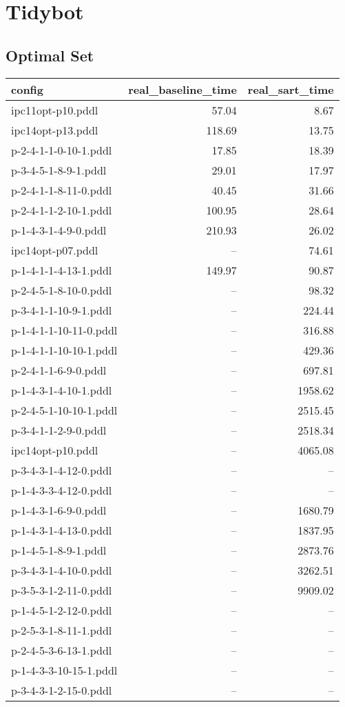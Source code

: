 \documentclass{article}
\begin{document}
                    
                \newpage \section{Tidybot}
                    \subsection*{Optimal Set}
                    
                            \begin{center}
                            \scriptsize
                            \begin{tabular}{@{}l|r|r@{}}
                            config & real\_baseline\_time & real\_sart\_time\\\midrule
                             ipc11opt-p10.pddl&57.04&8.67\\
 ipc14opt-p13.pddl&118.69&13.75\\
 p-2-4-1-1-0-10-1.pddl&17.85&18.39\\
 p-3-4-5-1-8-9-1.pddl&29.01&17.97\\
 p-2-4-1-1-8-11-0.pddl&40.45&31.66\\
 p-2-4-1-1-2-10-1.pddl&100.95&28.64\\
 p-1-4-3-1-4-9-0.pddl&210.93&26.02\\
 ipc14opt-p07.pddl&--&74.61\\
 p-1-4-1-1-4-13-1.pddl&149.97&90.87\\
 p-2-4-5-1-8-10-0.pddl&--&98.32\\
 p-3-4-1-1-10-9-1.pddl&--&224.44\\
 p-1-4-1-1-10-11-0.pddl&--&316.88\\
 p-1-4-1-1-10-10-1.pddl&--&429.36\\
 p-2-4-1-1-6-9-0.pddl&--&697.81\\
 p-1-4-3-1-4-10-1.pddl&--&1958.62\\
 p-2-4-5-1-10-10-1.pddl&--&2515.45\\
 p-3-4-1-1-2-9-0.pddl&--&2518.34\\
 ipc14opt-p10.pddl&--&4065.08\\
 p-3-4-3-1-4-12-0.pddl&--&--\\
 p-1-4-3-3-4-12-0.pddl&--&--\\
 p-1-4-3-1-6-9-0.pddl&--&1680.79\\
 p-1-4-3-1-4-13-0.pddl&--&1837.95\\
 p-1-4-5-1-8-9-1.pddl&--&2873.76\\
 p-3-4-3-1-4-10-0.pddl&--&3262.51\\
 p-3-5-3-1-2-11-0.pddl&--&9909.02\\
 p-1-4-5-1-2-12-0.pddl&--&--\\
 p-2-5-3-1-8-11-1.pddl&--&--\\
 p-2-4-5-3-6-13-1.pddl&--&--\\
 p-1-4-3-3-10-15-1.pddl&--&--\\
 p-3-4-3-1-2-15-0.pddl&--&--
                            \end{tabular}
                            \end{center}
                    
\end{document}
